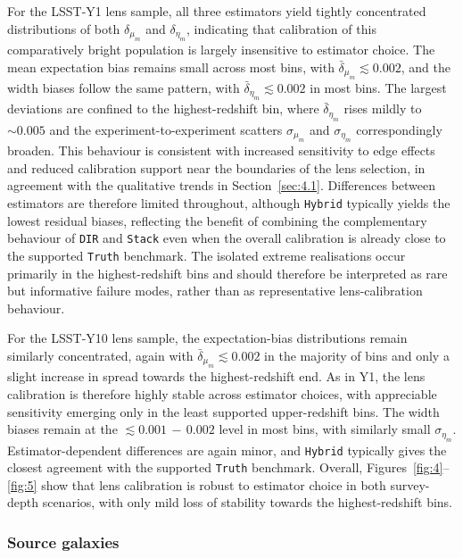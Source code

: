 For the LSST-Y1 lens sample, all three estimators yield tightly concentrated distributions of both \(\delta_{\mu_m}\) and \(\delta_{\eta_m}\), indicating that calibration of this comparatively bright population is largely insensitive to estimator choice. The mean expectation bias remains small across most bins, with \(\bar{\delta}_{\mu_m} \lesssim 0.002\), and the width biases follow the same pattern, with \(\bar{\delta}_{\eta_m} \lesssim 0.002\) in most bins. The largest deviations are confined to the highest-redshift bin, where \(\bar{\delta}_{\eta_m}\) rises mildly to \(\sim 0.005\) and the experiment-to-experiment scatters \(\sigma_{\mu_m}\) and \(\sigma_{\eta_m}\) correspondingly broaden. This behaviour is consistent with increased sensitivity to edge effects and reduced calibration support near the boundaries of the lens selection, in agreement with the qualitative trends in Section~\ref{sec:4.1}. Differences between estimators are therefore limited throughout, although \texttt{Hybrid} typically yields the lowest residual biases, reflecting the benefit of combining the complementary behaviour of \texttt{DIR} and \texttt{Stack} even when the overall calibration is already close to the supported \texttt{Truth} benchmark. The isolated extreme realisations occur primarily in the highest-redshift bins and should therefore be interpreted as rare but informative failure modes, rather than as representative lens-calibration behaviour.

For the LSST-Y10 lens sample, the expectation-bias distributions remain similarly concentrated, again with \(\bar{\delta}_{\mu_m} \lesssim 0.002\) in the majority of bins and only a slight increase in spread towards the highest-redshift end. As in Y1, the lens calibration is therefore highly stable across estimator choices, with appreciable sensitivity emerging only in the least supported upper-redshift bins. The width biases remain at the \(\lesssim 0.001\,{-}\,0.002\) level in most bins, with similarly small \(\sigma_{\eta_m}\). Estimator-dependent differences are again minor, and \texttt{Hybrid} typically gives the closest agreement with the supported \texttt{Truth} benchmark. Overall, Figures~\ref{fig:4}--\ref{fig:5} show that lens calibration is robust to estimator choice in both survey-depth scenarios, with only mild loss of stability towards the highest-redshift bins.

\subsubsection{Source galaxies} \label{sec:4.3.2}

